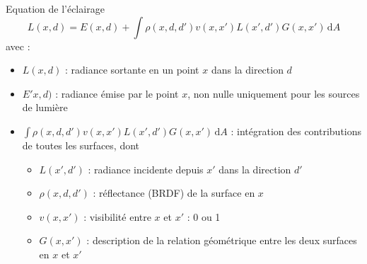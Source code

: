 \begin{frame}{Equation de l'éclairage}
    $$
    L(x,d) = E(x,d) + \int \rho(x,d,d')v(x,x')L(x',d')G(x,x')  \,\mathrm{d}A 
    $$
avec :
\begin{itemize}
    \item $L(x,d)$ : radiance sortante en un point $x$ dans la direction $d$ 
    \item $E'x,d)$ : radiance émise par le point $x$, non nulle uniquement pour les sources de lumière
    \item $\int \rho(x,d,d')v(x,x')L(x',d')G(x,x')  \,\mathrm{d}A$ : intégration des contributions de toutes les surfaces, dont
    \begin{itemize}
        \item $L(x',d')$ : radiance incidente depuis $x'$ dans la direction $d'$
        \item $\rho(x,d,d')$ : réflectance (BRDF) de la surface en $x$ 
        \item $v(x,x')$ : visibilité entre $x$ et $x'$ : 0 ou 1 
        \item $G(x,x')$ : description de la relation géométrique entre les deux surfaces en $x$ et $x'$
    \end{itemize}
\end{itemize}
\end{frame}

